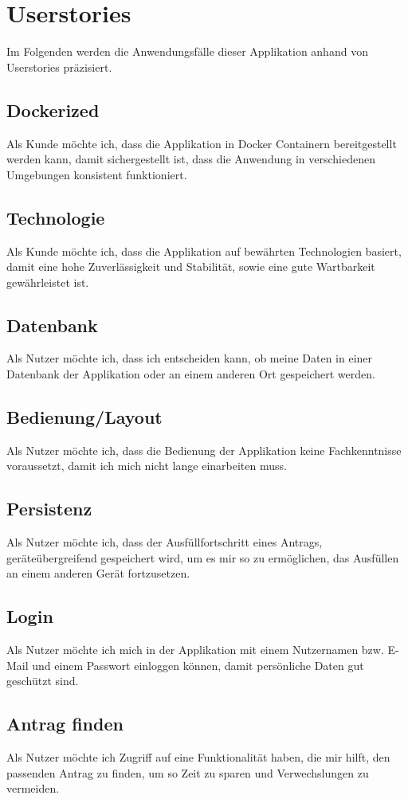\chapter{Userstories}\label{ch:userstories}
Im Folgenden werden die Anwendungsfälle dieser Applikation anhand von Userstories präzisiert.
\section{Dockerized}
Als Kunde möchte ich, dass die Applikation in Docker Containern bereitgestellt werden kann, damit 
sichergestellt ist, dass die Anwendung in verschiedenen Umgebungen konsistent funktioniert.

\section{Technologie}
Als Kunde möchte ich, dass die Applikation auf bewährten Technologien basiert, damit eine hohe
Zuverlässigkeit und Stabilität, sowie eine gute Wartbarkeit gewährleistet ist.
\section{Datenbank}
Als Nutzer möchte ich, dass ich entscheiden kann, ob meine Daten in einer Datenbank der Applikation 
oder an einem anderen Ort gespeichert werden.
\section{Bedienung/Layout}
Als Nutzer möchte ich, dass die Bedienung der Applikation keine Fachkenntnisse voraussetzt, damit 
ich mich nicht lange einarbeiten muss.
\section{Persistenz}
Als Nutzer möchte ich, dass der Ausfüllfortschritt eines Antrags, geräteübergreifend gespeichert wird,
um es mir so zu ermöglichen, das Ausfüllen an einem anderen Gerät fortzusetzen.
\section{Login}
Als Nutzer möchte ich mich in der Applikation mit einem Nutzernamen bzw. E-Mail und einem Passwort
einloggen können, damit persönliche Daten gut geschützt sind.
\section{Antrag finden}
Als Nutzer möchte ich Zugriff auf eine Funktionalität haben, die mir hilft, den passenden 
Antrag zu finden, um so Zeit zu sparen und Verwechslungen zu vermeiden.
